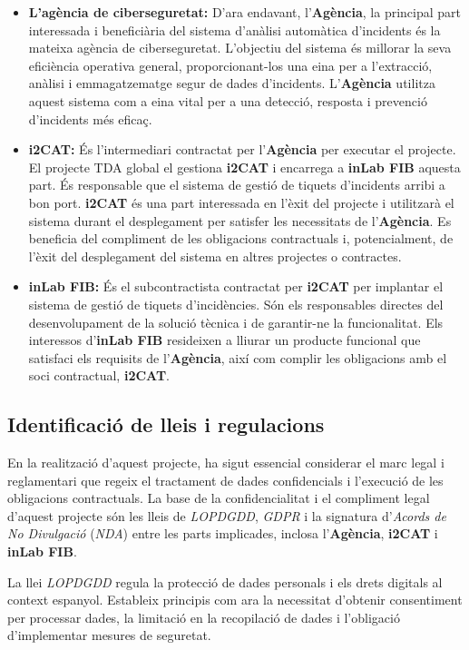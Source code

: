 \begin{itemize}
    \item \textbf{L'agència de ciberseguretat:} D'ara endavant, l'\textbf{Agència}, la principal part interessada i beneficiària del sistema d'anàlisi automàtica d'incidents és la mateixa agència de ciberseguretat. L'objectiu del sistema és millorar la seva eficiència operativa general, proporcionant-los una eina per a l'extracció, anàlisi i emmagatzematge segur de dades d'incidents. L'\textbf{Agència} utilitza aquest sistema com a eina vital per a una detecció, resposta i prevenció d'incidents més eficaç.
    \item \textbf{i2CAT:} És l'intermediari contractat per l'\textbf{Agència} per executar el projecte. El projecte TDA global el gestiona \textbf{i2CAT} i encarrega a \textbf{inLab FIB} aquesta part. És responsable que el sistema de gestió de tiquets d'incidents arribi a bon port. \textbf{i2CAT} és una part interessada en l'èxit del projecte i utilitzarà el sistema durant el desplegament per satisfer les necessitats de l'\textbf{Agència}. Es beneficia del compliment de les obligacions contractuals i, potencialment, de l'èxit del desplegament del sistema en altres projectes o contractes.
     \item \textbf{inLab FIB:} És el subcontractista contractat per \textbf{i2CAT} per implantar el sistema de gestió de tiquets d'incidències. Són els responsables directes del desenvolupament de la solució tècnica i de garantir-ne la funcionalitat. Els interessos d'\textbf{inLab FIB} resideixen a lliurar un producte funcional que satisfaci els requisits de l'\textbf{Agència}, així com complir les obligacions amb el soci contractual, \textbf{i2CAT}.
\end{itemize}


\subsection{Identificació de lleis i regulacions}
En la realització d'aquest projecte, ha sigut essencial considerar el marc legal i reglamentari que regeix el tractament de dades confidencials i l'execució de les obligacions contractuals. La base de la confidencialitat i el compliment legal d'aquest projecte són les lleis de \textit{LOPDGDD}, \textit{GDPR} i la signatura d'\textit{Acords de No Divulgació} (\textit{NDA}) entre les parts implicades, inclosa l'\textbf{Agència}, \textbf{i2CAT} i \textbf{inLab FIB}. 

La llei \textit{LOPDGDD} regula la protecció de dades personals i els drets digitals al context espanyol. Estableix principis com ara la necessitat d'obtenir consentiment per processar dades, la limitació en la recopilació de dades i l'obligació d'implementar mesures de seguretat.

